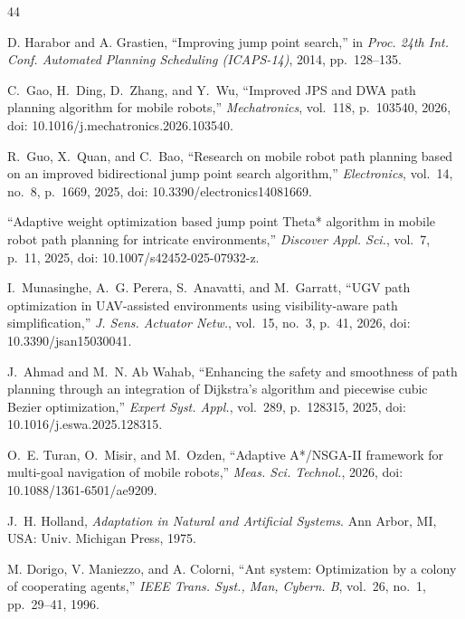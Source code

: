 \documentclass[lettersize,journal]{IEEEtran}
\begin{document}
\begin{thebibliography}{44}

D. Harabor and A. Grastien, ``Improving jump point search,'' in \textit{Proc. 24th Int. Conf. Automated Planning Scheduling (ICAPS-14)}, 2014, pp.~128--135.


C.~Gao, H.~Ding, D.~Zhang, and Y.~Wu, ``Improved JPS and DWA path planning algorithm for mobile robots,'' \textit{Mechatronics}, vol.~118, p.~103540, 2026, doi: 10.1016/j.mechatronics.2026.103540.


R.~Guo, X.~Quan, and C.~Bao, ``Research on mobile robot path planning based on an improved bidirectional jump point search algorithm,'' \textit{Electronics}, vol.~14, no.~8, p.~1669, 2025, doi: 10.3390/electronics14081669.


``Adaptive weight optimization based jump point Theta* algorithm in mobile robot path planning for intricate environments,'' \textit{Discover Appl. Sci.}, vol.~7, p.~11, 2025, doi: 10.1007/s42452-025-07932-z.


I.~Munasinghe, A.~G. Perera, S.~Anavatti, and M.~Garratt, ``UGV path optimization in UAV-assisted environments using visibility-aware path simplification,'' \textit{J. Sens. Actuator Netw.}, vol.~15, no.~3, p.~41, 2026, doi: 10.3390/jsan15030041.


J.~Ahmad and M.~N. Ab Wahab, ``Enhancing the safety and smoothness of path planning through an integration of Dijkstra's algorithm and piecewise cubic Bezier optimization,'' \textit{Expert Syst. Appl.}, vol.~289, p.~128315, 2025, doi: 10.1016/j.eswa.2025.128315.


O.~E. Turan, O.~Misir, and M.~Ozden, ``Adaptive A*/NSGA-II framework for multi-goal navigation of mobile robots,'' \textit{Meas. Sci. Technol.}, 2026, doi: 10.1088/1361-6501/ae9209.


J.~H. Holland, \textit{Adaptation in Natural and Artificial Systems}. Ann Arbor, MI, USA: Univ. Michigan Press, 1975.


M. Dorigo, V. Maniezzo, and A. Colorni, ``Ant system: Optimization by a colony of cooperating agents,'' \textit{IEEE Trans. Syst., Man, Cybern. B}, vol.~26, no.~1, pp.~29--41, 1996.


\end{thebibliography}
\end{document}
